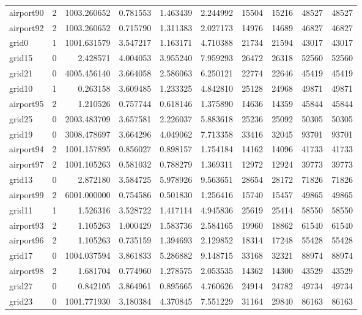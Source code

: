 \begin{longtable}{|l|r|r|r|r|r|r|r|r|r|}
airport90 & 2 & 1003.260652 & 0.781553 & 1.463439 & 2.244992 & 15504 & 15216 & 48527 & 48527 \\
airport92 & 2 & 1003.260652 & 0.715790 & 1.311383 & 2.027173 & 14976 & 14689 & 46827 & 46827 \\
grid0 & 1 & 1001.631579 & 3.547217 & 1.163171 & 4.710388 & 21734 & 21594 & 43017 & 43017 \\
grid15 & 0 & 2.428571 & 4.004053 & 3.955240 & 7.959293 & 26472 & 26318 & 52560 & 52560 \\
grid21 & 0 & 4005.456140 & 3.664058 & 2.586063 & 6.250121 & 22774 & 22646 & 45419 & 45419 \\
grid10 & 1 & 0.263158 & 3.609485 & 1.233325 & 4.842810 & 25128 & 24968 & 49871 & 49871 \\
airport95 & 2 & 1.210526 & 0.757744 & 0.618146 & 1.375890 & 14636 & 14359 & 45844 & 45844 \\
grid25 & 0 & 2003.483709 & 3.657581 & 2.226037 & 5.883618 & 25236 & 25092 & 50305 & 50305 \\
grid19 & 0 & 3008.478697 & 3.664296 & 4.049062 & 7.713358 & 33416 & 32045 & 93701 & 93701 \\
airport94 & 2 & 1001.157895 & 0.856027 & 0.898157 & 1.754184 & 14162 & 14096 & 41733 & 41733 \\
airport97 & 2 & 1001.105263 & 0.581032 & 0.788279 & 1.369311 & 12972 & 12924 & 39773 & 39773 \\
grid13 & 0 & 2.872180 & 3.584725 & 5.978926 & 9.563651 & 28654 & 28172 & 71826 & 71826 \\
airport99 & 2 & 6001.000000 & 0.754586 & 0.501830 & 1.256416 & 15740 & 15457 & 49865 & 49865 \\
grid11 & 1 & 1.526316 & 3.528722 & 1.417114 & 4.945836 & 25619 & 25414 & 58550 & 58550 \\
airport93 & 2 & 1.105263 & 1.000429 & 1.583736 & 2.584165 & 19960 & 18862 & 61540 & 61540 \\
airport96 & 2 & 1.105263 & 0.735159 & 1.394693 & 2.129852 & 18314 & 17248 & 55428 & 55428 \\
grid17 & 0 & 1004.037594 & 3.861833 & 5.286882 & 9.148715 & 33168 & 32321 & 88974 & 88974 \\
airport98 & 2 & 1.681704 & 0.774960 & 1.278575 & 2.053535 & 14362 & 14300 & 43529 & 43529 \\
grid27 & 0 & 0.842105 & 3.864961 & 0.895665 & 4.760626 & 24914 & 24782 & 49734 & 49734 \\
grid23 & 0 & 1001.771930 & 3.180384 & 4.370845 & 7.551229 & 31164 & 29840 & 86163 & 86163 \\

\end{longtable}
